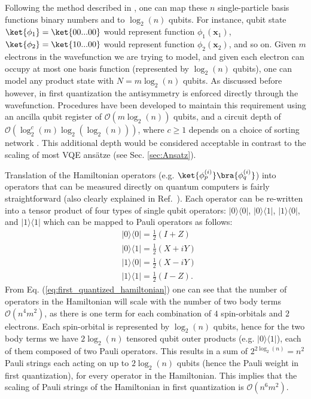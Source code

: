Following the method described in \cite{Abrams1997}, one can map these $n$ single-particle basis functions binary numbers and to $\log_2(n)$ qubits. For instance, qubit state $\ket{\phi_1} = \ket{00...00}$ would represent function $\phi_1(\mathbf{x}_1)$, $\ket{\phi_2} = \ket{10...00}$ would represent function $\phi_2(\mathbf{x}_2)$, and so on. Given $m$ electrons in the wavefunction we are trying to model, and given each electron can occupy at most one basis function (represented by $\log_2(n)$ qubits), one can model any product state with $N=m\log_2(n)$ qubits. 
As discussed before however, in first quantization the antisymmetry is enforced directly through the wavefunction. Procedures have been developed to maintain this requirement using an ancilla qubit register of $\mathcal{O}(m\log_2(n))$ qubits, and a circuit depth of $\mathcal{O}(\log^c_2(m)\log_2(\log_2(n)))$, where $c \geq 1$ depends on a choice of sorting network \cite{Berry2018}. This additional depth would be considered acceptable in contrast to the scaling of most VQE ans\"atze (see Sec. \ref{sec:Ansatz}).  

Translation of the Hamiltonian operators (e.g. $\ket{\phi_p^{(i)}} \bra{\phi_q^{(i)}}$) into operators that can be measured directly on quantum computers is fairly straightforward (also clearly explained in Ref.~\cite{mcardleQuantumComputationalChemistry2018}). Each operator can be re-written into a tensor product of four types of single qubit operators: $|0 \rangle \langle 0 |$, $|0 \rangle \langle 1 |$, $|1 \rangle \langle 0 |$, and $|1 \rangle \langle 1|$ which can be mapped to Pauli operators as follows: 
\begin{equation} \label{eq:first_quantized_paulis}
    \begin{aligned}
        &|0 \rangle \langle 0 | = \frac{1}{2} (I + Z) \\
        &|0 \rangle \langle 1 | = \frac{1}{2} (X + iY) \\
        &|1 \rangle \langle 0 | = \frac{1}{2} (X - iY) \\
        &|1 \rangle \langle 1 | = \frac{1}{2} (I - Z).
    \end{aligned}
\end{equation}
From Eq. (\ref{eq:first_quantized_hamiltonian}) one can see that the number of operators in the Hamiltonian will scale with the number of two body terms $\mathcal{O}(n^4m^2)$, as there is one term for each combination of $4$ spin-orbitals and $2$ electrons. Each spin-orbital is represented by $\log_2(n)$ qubits, hence for the two body terms we have $2\log_2(n)$ tensored qubit outer products (e.g. $|0 \rangle \langle 1 |$), each of them composed of two Pauli operators. This results in a sum of $2^{2\log_2(n)}= n^2$ Pauli strings each acting on up to $2\log_2(n)$ qubits (hence the Pauli weight in first quantization), for every operator in the Hamiltonian. This implies that the scaling of Pauli strings of the Hamiltonian in first quantization is $\mathcal{O}(n^6m^2)$.

